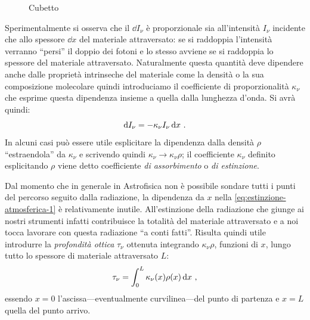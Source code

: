         \begin{figure}
            \centering
            
            \caption{Cubetto}
        \end{figure}
        Sperimentalmente si osserva che il $\dd{I_\nu}$ è proporzionale sia all'intensità $I_\nu$ incidente che allo spessore $\dd{x}$ del materiale attraversato: se si raddoppia l'intensità verranno ``persi'' il doppio dei fotoni e lo stesso avviene se si raddoppia lo spessore del materiale attraversato. Naturalmente questa quantità deve dipendere anche dalle proprietà intrinseche del materiale come la densità o la sua composizione molecolare quindi introduciamo il coefficiente di proporzionalità $\kappa_\nu$ che esprime questa dipendenza insieme a quella dalla lunghezza d'onda. Si avrà quindi:
        \begin{equation}
            \label{eq:estinzione-atmosferica-1}
            \dd{I_\nu} = - \kappa_\nu I_\nu \dd{x}
            \,.
        \end{equation}
        In alcuni casi può essere utile esplicitare la dipendenza dalla densità $\rho$ ``estraendola'' da $\kappa_\nu$ e scrivendo quindi $\kappa_\nu \to \kappa_\nu\rho$; il coefficiente $\kappa_\nu$ definito esplicitando $\rho$ viene detto coefficiente \emph{di assorbimento} o \emph{di estinzione}.

        Dal momento che in generale in Astrofisica non è possibile sondare tutti i punti del percorso seguito dalla radiazione, la dipendenza da $x$ nella \eqref{eq:estinzione-atmosferica-1} è relativamente inutile. All'estinzione della radiazione che giunge ai nostri strumenti infatti contribuisce la totalità del materiale attraversato e a noi tocca lavorare con questa radiazione ``a conti fatti''. Risulta quindi utile introdurre la \emph{profondità ottica} $\tau_\nu$ ottenuta integrando $\kappa_\nu\rho$, funzioni di $x$, lungo tutto lo spessore di materiale attraversato $L$:
        \begin{equation}
            \label{eq:spessore-ottico}
            \tau_\nu = \int_{0}^{L} \kappa_\nu\pqty{x} \rho\pqty{x} \dd{x}
            \mycomma
        \end{equation}
        essendo $x=0$ l'ascissa---eventualmente curvilinea---del punto di partenza e $x=L$ quella del punto arrivo.

